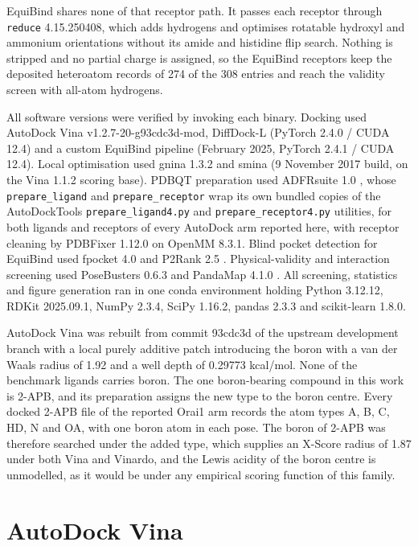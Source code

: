 EquiBind shares none of that receptor path. It passes each receptor through \texttt{reduce} 4.15.250408, which adds hydrogens and optimises rotatable hydroxyl and ammonium orientations without its amide and histidine flip search. Nothing is stripped and no partial charge is assigned, so the EquiBind receptors keep the deposited heteroatom records of 274 of the 308 entries and reach the validity screen with all-atom hydrogens.

All software versions were verified by invoking each binary. Docking used AutoDock Vina v1.2.7-20-g93cdc3d-mod, DiffDock-L (PyTorch 2.4.0 / CUDA 12.4) and a custom EquiBind pipeline (February 2025, PyTorch 2.4.1 / CUDA 12.4). Local optimisation used gnina 1.3.2 and smina (9 November 2017 build, on the Vina 1.1.2 scoring base). PDBQT preparation used ADFRsuite 1.0 \cite{ref089}, whose \texttt{prepare\_ligand} and \texttt{prepare\_receptor} wrap its own bundled copies of the AutoDockTools \cite{ref049} \texttt{prepare\_ligand4.py} and \texttt{prepare\_receptor4.py} utilities, for both ligands and receptors of every AutoDock arm reported here, with receptor cleaning by PDBFixer 1.12.0 on OpenMM 8.3.1. Blind pocket detection for EquiBind used fpocket 4.0 \cite{ref060} and P2Rank 2.5 \cite{ref061}. Physical-validity and interaction screening used PoseBusters 0.6.3 \cite{ref035} and PandaMap 4.1.0 \cite{ref090}. All screening, statistics and figure generation ran in one conda environment holding Python 3.12.12, RDKit 2025.09.1, NumPy 2.3.4, SciPy 1.16.2, pandas 2.3.3 and scikit-learn 1.8.0.

AutoDock Vina was rebuilt from commit 93cdc3d of the upstream development branch with a local purely additive patch introducing the boron with a van der Waals radius of 1.92\angstrom{} and a well depth of 0.29773 kcal/mol. None of the benchmark ligands carries boron. The one boron-bearing compound in this work is 2-APB, and its preparation assigns the new type to the boron centre. Every docked 2-APB file of the reported Orai1 arm records the atom types A, B, C, HD, N and OA, with one boron atom in each pose. The boron of 2-APB was therefore searched under the added type, which supplies an X-Score radius of 1.87\angstrom{} under both Vina and Vinardo, and the Lewis acidity of the boron centre is unmodelled, as it would be under any empirical scoring function of this family.

\hypertarget{autodock-vina-2}{%
\section{AutoDock Vina}\label{autodock-vina-2}}

